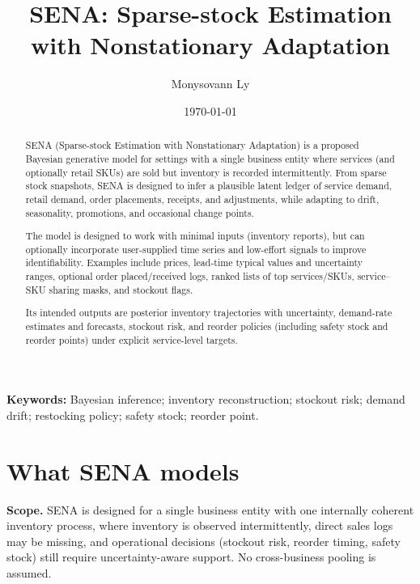 \documentclass[11pt]{article}
\title{SENA: Sparse-stock Estimation with Nonstationary Adaptation}
\author{Monysovann Ly}
\date{\today}
\begin{document}
\begin{titlepage}
\maketitle

\begin{abstract}
SENA (Sparse-stock Estimation with Nonstationary Adaptation) is a proposed Bayesian generative model for settings with a single business entity where services (and optionally retail SKUs) are sold but inventory is recorded intermittently. From sparse stock snapshots, SENA is designed to infer a plausible latent ledger of service demand, retail demand, order placements, receipts, and adjustments, while adapting to drift, seasonality, promotions, and occasional change points.

The model is designed to work with minimal inputs (inventory reports), but can optionally incorporate user-supplied time series and low-effort signals to improve identifiability.
Examples include prices, lead-time typical values and uncertainty ranges, optional order placed/received logs, ranked lists of top services/SKUs, service--SKU sharing masks, and stockout flags.

Its intended outputs are posterior inventory trajectories with uncertainty, demand-rate estimates and forecasts, stockout risk, and reorder policies (including safety stock and reorder points) under explicit service-level targets.
\end{abstract}

\vspace{1em}
\noindent\textbf{Keywords:} Bayesian inference; inventory reconstruction; stockout risk; demand drift; restocking policy; safety stock; reorder point.

\end{titlepage}

\tableofcontents
\newpage

\section{What SENA models}

\textbf{Scope.} SENA is designed for a single business entity with one internally coherent inventory process, where inventory is observed intermittently, direct sales logs may be missing, and operational decisions (stockout risk, reorder timing, safety stock) still require uncertainty-aware support.
No cross-business pooling is assumed.
\end{document}
